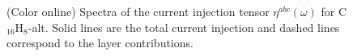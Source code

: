\documentclass[pss]{wiley2sp} %
\begin{document}
\begin{figure}[t]
\centering
{}\\
\\
\caption{(Color online) Spectra of the current injection tensor
{$\eta^{abc}(\omega)$} for C$_{16}$H$_{8}$-alt. Solid lines are the total
current injection and dashed lines correspond to the layer
contributions.\label{fig:alt-eta}}
\end{figure}
\end{document}
